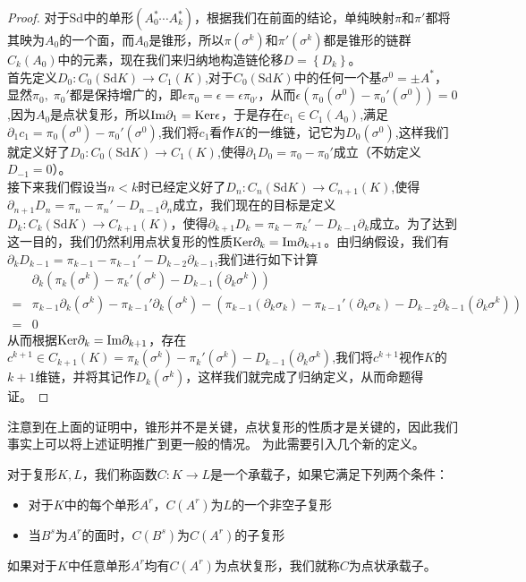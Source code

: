 \begin{proof}
对于$\text{Sd}$中的单形$(A_{0}^{*}\cdots A_{k}^{*})$，根据我们在前面的结论，单纯映射$\pi$和$\pi'$都将其映为$A_{0}$的一个面，而$A_{0}$是锥形，所以$\pi(\sigma^{k})$和$\pi'(\sigma^{k})$都是锥形的链群$C_{k}(A_{0})$中的元素，现在我们来归纳地构造链伦移$D=\left\{D_{k}\right\}$。\\
首先定义$D_{0}:C_{0}(\text{Sd}K)\rightarrow C_{1}(K)$,对于$C_{0}(\text{Sd}K)$中的任何一个基$\sigma^{0}=\pm A^{*}$，显然$\pi_{0},\;\pi_{0}'$都是保持增广的，即$\epsilon\pi_{0}=\epsilon=\epsilon\pi_{0'}$，从而$\epsilon(\pi_{0}(\sigma^{0})-\pi_{0}'(\sigma^{0}))=0$,因为$A_{0}$是点状复形，所以${\rm Im} \partial_{1}={\rm Ker}\epsilon$，于是存在$c_{1}\in C_{1}(A_{0})$,满足$\partial_{1}c_{1}=\pi_{0}(\sigma^{0})-\pi_{0}'(\sigma^{0})$,我们将$c_{1}$看作$K$的一维链，记它为$D_{0}(\sigma^{0})$,这样我们就定义好了$D_{0}:C_{0}(\text{Sd}K)\rightarrow C_{1}(K)$,使得$\partial_{1}D_{0}=\pi_{0}-\pi_{0}'$成立（不妨定义$D_{-1}=0$）。\\
接下来我们假设当$n<k$时已经定义好了$D_{n}:C_{n}(\text{Sd}K)\rightarrow C_{n+1}(K)$,使得$\partial_{n+1}D_{n}=\pi_{n}-\pi_{n}'-D_{n-1}\partial_{n}$成立，我们现在的目标是定义$D_{k}:C_{k}(\text{Sd}K)\rightarrow C_{k+1}(K)$，使得$\partial_{k+1}D_{k}=\pi_{k}-\pi_{k}'-D_{k-1}\partial_{k}$成立。为了达到这一目的，我们仍然利用点状复形的性质${\rm Ker}\partial_{k}={\rm Im}\partial_{k+1}$。由归纳假设，我们有$\partial_{k}D_{k-1}=\pi_{k-1}-\pi_{k-1}'-D_{k-2}\partial_{k-1}$,我们进行如下计算
\begin{equation*}
\begin{aligned}
    &\partial_{k}(\pi_{k}(\sigma^{k})-\pi_{k}'(\sigma^{k})-D_{k-1}(\partial_{k}\sigma^{k}))\\
    =&\pi_{k-1}\partial_{k}(\sigma^{k})-\pi_{k-1}'\partial_{k}(\sigma^{k})-\left(\pi_{k-1}(\partial_{k}\sigma_{k})-\pi_{k-1}'(\partial_{k}\sigma_{k})-D_{k-2}\partial_{k-1}(\partial_{k}\sigma^{k})\right)\\
    =&0
    \end{aligned}
\end{equation*}
从而根据${\rm Ker}\partial_{k}={\rm Im}\partial_{k+1}$，存在$c^{k+1}\in C_{k+1}(K)=\pi_{k}(\sigma^{k})-\pi_{k}'(\sigma^{k})-D_{k-1}(\partial_{k}\sigma^{k})$,我们将$c^{k+1}$视作$K$的$k+1$维链，并将其记作$D_{k}(\sigma^{k})$，这样我们就完成了归纳定义，从而命题得证。
\end{proof}
注意到在上面的证明中，锥形并不是关键，点状复形的性质才是关键的，因此我们事实上可以将上述证明推广到更一般的情况。
为此需要引入几个新的定义。
\begin{definition}
对于复形$K,L$，我们称函数$C:K\rightarrow L$是一个承载子，如果它满足下列两个条件：
\begin{itemize}
    \item 对于$K$中的每个单形$A^{r}$，$C(A^{r})$为$L$的一个非空子复形
    \item 当$B^{s}$为$A^{r}$的面时，$C(B^{s})$为$C(A^{r})$的子复形
\end{itemize}
如果对于$K$中任意单形$A^{r}$均有$C(A^{r})$为点状复形，我们就称$C$为点状承载子。
\end{definition}
